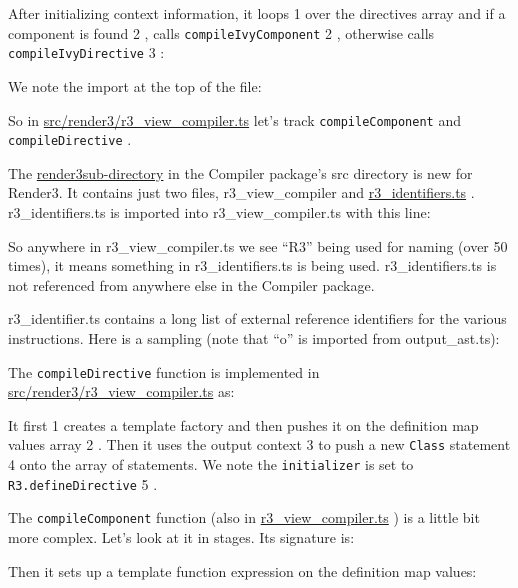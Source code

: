 

After initializing context information, it loops
1
over the directives array and if a
component is found
2
, calls
\texttt{compileIvyComponent}
2
, otherwise calls
\texttt{compileIvyDirective}
3
:



We note the import at the top of the file:



So in
\url{src/render3/r3_view_compiler.ts}
let’s track
\texttt{compileComponent}
and
\texttt{compileDirective}
.

The
\url{render3sub-directory}
in the Compiler package’s src directory is new for Render3.
It contains just two files, r3\_view\_compiler and
\url{r3_identifiers.ts}
. r3\_identifiers.ts is
imported into r3\_view\_compiler.ts with this line:



So anywhere in r3\_view\_compiler.ts we see “R3” being used for naming (over 50
times), it means something in r3\_identifiers.ts is being used. r3\_identifiers.ts  is not
referenced from anywhere else in the Compiler package.

r3\_identifier.ts contains a long list of external reference identifiers for the various
instructions. Here is a sampling (note that “o” is imported from output\_ast.ts):



The
\texttt{compileDirective}
function is implemented in
\url{src/render3/r3_view_compiler.ts}
as:



It first
1
creates a template factory and then pushes it on the definition map values
array
2
. Then it uses the output context
3
to push a new
\texttt{Class}
statement
4
onto the
array of statements. We note the
\texttt{initializer}
is set to
\texttt{R3.defineDirective}
5
.

The
\texttt{compileComponent}
function (also in
\url{r3_view_compiler.ts}
) is a little bit more
complex. Let’s look at it in stages. Its signature is:



Then it sets up a template function expression on the definition map values:

